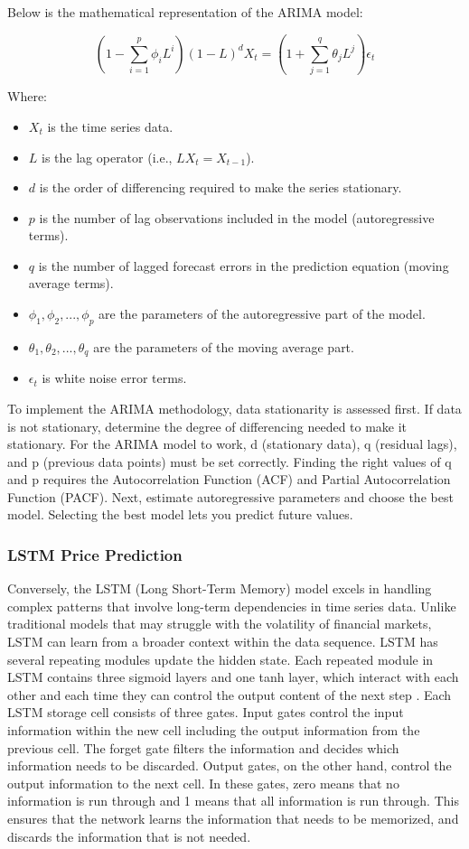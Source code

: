 \documentclass[conference]{IEEEtran}
\begin{document}
Below is the mathematical representation of the ARIMA model:

\[
(1 - \sum_{i=1}^p \phi_i L^i) (1 - L)^d X_t = (1 + \sum_{j=1}^q \theta_j L^j) \epsilon_t
\]

Where:
\begin{itemize}
    \item $X_t$ is the time series data.
    \item $L$ is the lag operator (i.e., $LX_t = X_{t-1}$).
    \item $d$ is the order of differencing required to make the series stationary.
    \item $p$ is the number of lag observations included in the model (autoregressive terms).
    \item $q$ is the number of lagged forecast errors in the prediction equation (moving average terms).
    \item $\phi_1, \phi_2, ..., \phi_p$ are the parameters of the autoregressive part of the model.
    \item $\theta_1, \theta_2, ..., \theta_q$ are the parameters of the moving average part.
    \item $\epsilon_t$ is white noise error terms.
\end{itemize}

To implement the ARIMA methodology, data stationarity is assessed first. If data is not stationary, determine the degree of differencing needed to make it stationary. For the ARIMA model to work, d (stationary data), q (residual lags), and p (previous data points) must be set correctly. Finding the right values of q and p requires the Autocorrelation Function (ACF) and Partial Autocorrelation Function (PACF). Next, estimate autoregressive parameters and choose the best model. Selecting the best model lets you predict future values. 



\subsubsection{LSTM Price Prediction} 

Conversely, the LSTM (Long Short-Term Memory) model excels in handling complex patterns that involve long-term dependencies in time series data. Unlike traditional models that may struggle with the volatility of financial markets, LSTM can learn from a broader context within the data sequence. LSTM has several repeating modules update the hidden state. Each repeated module in LSTM contains three sigmoid layers and one tanh layer, which interact with each other and each time they can control the output content of the next step \cite{b6}. Each LSTM storage cell consists of three gates. Input gates control the input information within the new cell including the output information from the previous cell. The forget gate filters the information and decides which information needs to be discarded. Output gates, on the other hand, control the output information to the next cell. In these gates, zero means that no information is run through and 1 means that all information is run through. This ensures that the network learns the information that needs to be memorized, and discards the information that is not needed.
\end{document}
